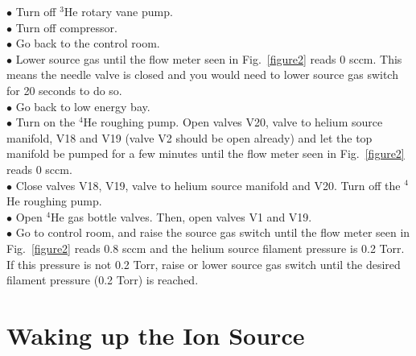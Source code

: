 \documentclass{article}
\begin{document}
$\bullet$ Turn off $^{3}$He rotary vane pump.\\
$\bullet$ Turn off compressor.\\
$\bullet$ Go back to the control room.\\
$\bullet$ Lower source gas until the flow meter seen in Fig.~\ref{figure2} reads 0 sccm. This means the needle valve is closed and you would need to lower source gas switch for 20 seconds to do so.\\
$\bullet$ Go back to low energy bay.\\
$\bullet$ Turn on the $^{4}$He roughing pump. Open valves V20, valve to helium source manifold, V18 and V19 (valve V2 should be open already) and let the top manifold be pumped for a few minutes until the flow meter seen in Fig.~\ref{figure2} reads 0 sccm.\\
$\bullet$ Close valves V18, V19, valve to helium source manifold and V20. Turn off the $^{4}$He roughing pump.\\
$\bullet$ Open $^{4}$He gas bottle valves. Then, open valves V1 and V19.\\
$\bullet$ Go to control room, and raise the source gas switch until the flow meter seen in Fig.~\ref{figure2} reads 0.8 sccm and the helium source filament pressure is 0.2 Torr. If this pressure is not 0.2 Torr, raise or lower source gas switch until the desired filament pressure (0.2 Torr) is reached.

\section{Waking up the Ion Source}
\end{document}
